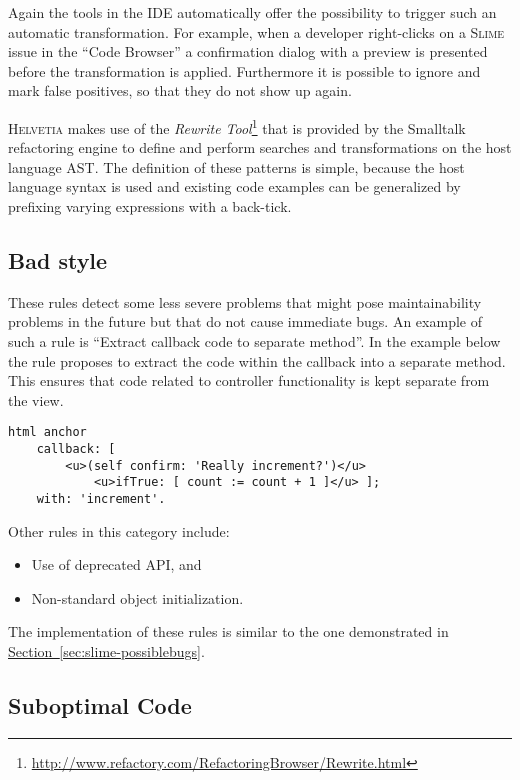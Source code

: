 \documentclass[10pt,twocolumn]{article}
\newcommand{\Slime}{\textsc{Slime}\xspace}
\newcommand{\Helvetia}{\textsc{Helvetia}\xspace}
\newcommand{\secref}[1]{\hyperref[sec:#1]{Section~\ref{sec:#1}}}
\newenvironment{bullets}[0]
	{\begin{itemize}
		\setlength{\itemsep}{1pt}
		\setlength{\parskip}{0pt}
		\setlength{\parsep}{0pt}}
	{\end{itemize}}
\begin{document}
Again the tools in the IDE automatically offer the possibility to trigger such an automatic transformation. For example, when a developer right-clicks on a \Slime issue in the ``Code Browser'' a confirmation dialog with a preview is presented before the transformation is applied. Furthermore it is possible to ignore and mark false positives, so that they do not show up again.

\Helvetia makes use of the \emph{Rewrite Tool}\footnote{\url{http://www.refactory.com/RefactoringBrowser/Rewrite.html}} that is provided by the Smalltalk refactoring engine \cite{Robe97a} to define and perform searches and transformations on the host language AST. The definition of these patterns is simple, because the host language syntax is used and existing code examples can be generalized by prefixing varying expressions with a back-tick.

\subsection{Bad style}\label{sec:slime-badstyle}

These rules detect some less severe problems that might pose maintainability problems in the future but that do not cause immediate bugs. An example of such a rule is ``Extract callback code to separate method''. In the example below the rule proposes to extract the code within the callback into a separate method. This ensures that code related to controller functionality is kept separate from the view.

\begin{lstlisting}
html anchor
	callback: [
		<u>(self confirm: 'Really increment?')</u>
			<u>ifTrue: [ count := count + 1 ]</u> ];
	with: 'increment'.
\end{lstlisting}

\noindent Other rules in this category include:

\begin{bullets}
	\item Use of deprecated API, and
	\item Non-standard object initialization.
\end{bullets}

The implementation of these rules is similar to the one demonstrated in \secref{slime-possiblebugs}.

\subsection{Suboptimal Code}\label{sec:slime-suboptimal}
\end{document}
